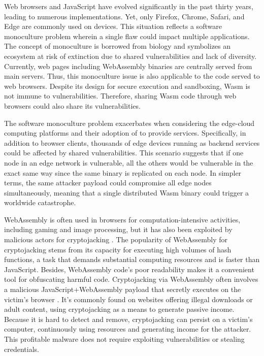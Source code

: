 Web browsers and JavaScript have evolved significantly in the past thirty years, leading to numerous implementations. 
Yet, only Firefox, Chrome, Safari, and Edge are commonly used on devices.
This situation reflects a software monoculture problem wherein a single flaw could impact multiple applications. 
The concept of monoculture is borrowed from biology and symbolizes an ecosystem at risk of extinction due to shared vulnerabilities and lack of diversity. 
Currently, web pages including WebAssembly binaries are centrally served from main servers. 
Thus, this monoculture issue is also applicable to the \Wasm code served to web browsers. 
Despite its design for secure execution and sandboxing, Wasm is not immune to vulnerabilities. 
Therefore, sharing Wasm code through web browsers could also share its vulnerabilities. 

The software monoculture problem exacerbates when considering the edge-cloud computing platforms and their adoption of \Wasm to provide services.
Specifically, in addition to browser clients, thousands of edge devices running \Wasm as backend services could be affected by shared vulnerabilities. 
This scenario suggests that if one node in an edge network is vulnerable, all the others would be vulnerable in the exact same way since the same binary is replicated on each node. 
In simpler terms, the same attacker payload could compromise all edge nodes simultaneously, meaning that a single distributed Wasm binary could trigger a worldwide catastrophe.



WebAssembly is often used in browsers for computation-intensive activities, including gaming and image processing, but it has also been exploited by malicious actors for cryptojacking \cite{10.1145/3339252.3339261}.
The popularity of WebAssembly for cryptojacking stems from its capacity for executing high volumes of hash functions, a task that demands substantial computing resources and is faster than JavaScript.
Besides, WebAssembly code's poor readability makes it a convenient tool for obfuscating harmful code.
Cryptojacking via WebAssembly often involves a malicious JavaScript+WebAssembly payload that secretly executes on the victim's browser \cite{9566204}.
It's commonly found on websites offering illegal downloads or adult content, using cryptojacking as a means to generate passive income.
Because it is hard to detect and remove, cryptojacking can persist on a victim's computer, continuously using resources and generating income for the attacker.
This profitable malware does not require exploiting vulnerabilities or stealing credentials.



